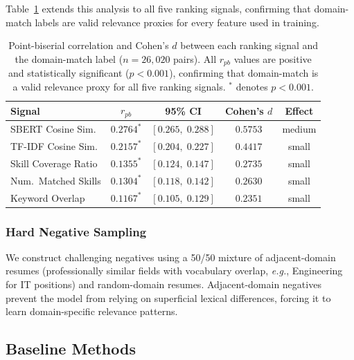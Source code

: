\documentclass[smallcondensed,numbers]{sn-jnl}
\begin{document}
Table~\ref{tab:label_quality} extends this analysis to all five ranking signals, confirming that domain-match labels are valid relevance proxies for every feature used in training.

\begin{table}[t]
\centering
\caption{Point-biserial correlation and Cohen's $d$ between each ranking signal and the domain-match label ($n = 26{,}020$ pairs). All $r_{pb}$ values are positive and statistically significant ($p < 0.001$), confirming that domain-match is a valid relevance proxy for all five ranking signals. $^{*}$ denotes $p < 0.001$.}
\label{tab:label_quality}
\begin{tabular}{lcccc}
\toprule
Signal & $r_{pb}$ & 95\% CI & Cohen's $d$ & Effect \\
\midrule
SBERT Cosine Sim.    & $0.2764^{*}$ & $[0.265,\;0.288]$ & $0.5753$ & medium \\
TF-IDF Cosine Sim.   & $0.2157^{*}$ & $[0.204,\;0.227]$ & $0.4417$ & small \\
Skill Coverage Ratio & $0.1355^{*}$ & $[0.124,\;0.147]$ & $0.2735$ & small \\
Num.\ Matched Skills & $0.1304^{*}$ & $[0.118,\;0.142]$ & $0.2630$ & small \\
Keyword Overlap      & $0.1167^{*}$ & $[0.105,\;0.129]$ & $0.2351$ & small \\
\bottomrule
\end{tabular}
\end{table}

\subsubsection{Hard Negative Sampling}
We construct challenging negatives using a 50/50 mixture of adjacent-domain resumes (professionally similar fields with vocabulary overlap, \textit{e.g.}, Engineering for IT positions) and random-domain resumes. Adjacent-domain negatives prevent the model from relying on superficial lexical differences, forcing it to learn domain-specific relevance patterns.

\subsection{Baseline Methods}
\end{document}
